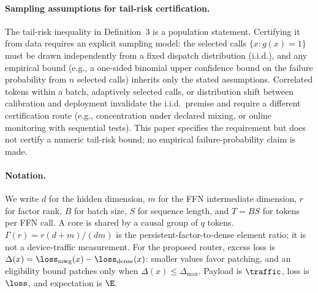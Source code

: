 \paragraph{Sampling assumptions for tail-risk certification.}
The tail-risk inequality in Definition~3 is a population statement.  Certifying
it from data requires an explicit sampling model: the selected calls
$\{x: g(x)=1\}$ must be drawn independently from a fixed dispatch
distribution (i.i.d.), and any empirical bound (e.g., a one-sided binomial
upper confidence bound on the failure probability from $n$ selected calls)
inherits only the stated assumptions.  Correlated tokens within a batch,
adaptively selected calls, or distribution shift between calibration and
deployment invalidate the i.i.d.\ premise and require a different
certification route (e.g., concentration under declared mixing, or online
monitoring with sequential tests).  This paper specifies the requirement but
does not certify a numeric tail-risk bound; no empirical failure-probability
claim is made.


\paragraph{Notation.}
We write $d$ for the hidden dimension, $m$ for the FFN intermediate dimension,
$r$ for factor rank, $B$ for batch size, $S$ for sequence length, and $T=BS$
for tokens per FFN call.  A core is shared by a causal group of $q$ tokens.
$\Gamma(r)=r(d+m)/(dm)$ is the persistent-factor-to-dense element ratio; it is
not a device-traffic measurement.  For the proposed router, excess loss is
$\Delta(x)=\loss_{\mathrm{mwg}}(x)-\loss_{\mathrm{dense}}(x)$: smaller values
favor patching, and an eligibility bound patches only when
$\widehat\Delta(x)\le\Delta_{\max}$. Payload is $\traffic$,
loss is $\loss$, and expectation is $\E$.

